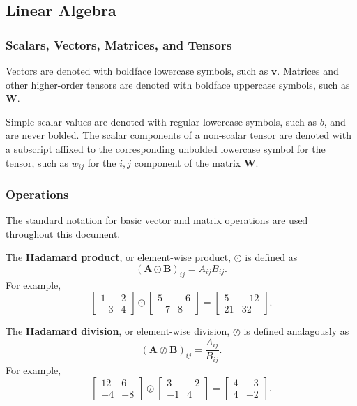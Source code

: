 \documentclass[12pt]{report}
\theoremstyle{definition}
\theoremstyle{remark}
\begin{document}
\subsection{Linear Algebra}
\subsubsection{Scalars, Vectors, Matrices, and Tensors}
Vectors are denoted with boldface lowercase symbols, such as $\mathbf{v}$. Matrices and other higher-order tensors are denoted with boldface uppercase symbols, such as $\mathbf{W}$.

Simple scalar values are denoted with regular lowercase symbols, such as $b$, and are never bolded. The scalar components of a non-scalar tensor are denoted with a subscript affixed to the corresponding unbolded lowercase symbol for the tensor, such as $w_{ij}$ for the $i,j$ component of the matrix $\mathbf{W}$.

\subsubsection{Operations} %
The standard notation for basic vector and matrix operations are used throughout this document.

The \textbf{Hadamard product}, or element-wise product, $\odot$ is defined as
\begin{equation}
    ({{\mathbf{A} \odot \mathbf{B}}})_{ij} = A_{ij}B_{ij}.
\end{equation}
For example,
\begin{equation}
    \begin{bmatrix}
        1 & 2 \\
        -3 & 4
    \end{bmatrix} \odot \begin{bmatrix}
        5 & -6 \\
        -7 & 8
    \end{bmatrix} = \begin{bmatrix}
        5 & -12 \\
        21 & 32
    \end{bmatrix}.
\end{equation}

The \textbf{Hadamard division}, or element-wise division, $\oslash$ is defined analagously as
\begin{equation}
    ({{\mathbf{A} \oslash \mathbf{B}}})_{ij} = \frac{A_{ij}}{B_{ij}}.
\end{equation}
For example,
\begin{equation}
    \begin{bmatrix}
        12 & 6 \\
        -4 & -8
    \end{bmatrix} \oslash \begin{bmatrix}
        3 & -2 \\
        -1 & 4
    \end{bmatrix} = \begin{bmatrix}
        4 & -3 \\
        4 & -2
    \end{bmatrix}.
\end{equation}
\end{document}
